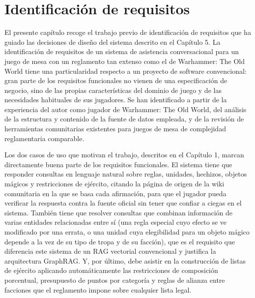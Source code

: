 \documentclass[11pt,a4paper,spanish]{book}
\numberwithin{equation}{chapter}
\numberwithin{figure}{chapter}
\numberwithin{table}{chapter}
\begin{document}
\chapter{Identificación de requisitos}

El presente capítulo recoge el trabajo previo de identificación de requisitos que ha guiado las decisiones de diseño del sistema descrito en el Capítulo 5. La identificación de requisitos de un sistema de asistencia conversacional para un juego de mesa con un reglamento tan extenso como el de Warhammer: The Old World tiene una particularidad respecto a un proyecto de software convencional: gran parte de los requisitos funcionales no vienen de una especificación de negocio, sino de las propias características del dominio de juego y de las necesidades habituales de sus jugadores. Se han identificado a partir de la experiencia del autor como jugador de Warhammer: The Old World, del análisis de la estructura y contenido de la fuente de datos empleada, y de la revisión de herramientas comunitarias existentes para juegos de mesa de complejidad reglamentaria comparable.

Los dos casos de uso que motivan el trabajo, descritos en el Capítulo 1, marcan directamente buena parte de los requisitos funcionales. El sistema tiene que responder consultas en lenguaje natural sobre reglas, unidades, hechizos, objetos mágicos y restricciones de ejército, citando la página de origen de la wiki comunitaria en la que se basa cada afirmación, para que el jugador pueda verificar la respuesta contra la fuente oficial sin tener que confiar a ciegas en el sistema. También tiene que resolver consultas que combinan información de varias entidades relacionadas entre sí (una regla especial cuyo efecto se ve modificado por una errata, o una unidad cuya elegibilidad para un objeto mágico depende a la vez de su tipo de tropa y de su facción), que es el requisito que diferencia este sistema de un RAG vectorial convencional y justifica la arquitectura GraphRAG. Y, por último, debe asistir en la construcción de listas de ejército aplicando automáticamente las restricciones de composición porcentual, presupuesto de puntos por categoría y reglas de alianza entre facciones que el reglamento impone sobre cualquier lista legal.
\end{document}
